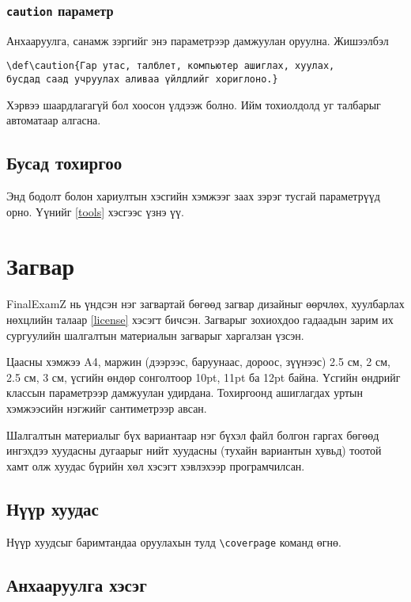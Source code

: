 \documentclass[10pt]{article}
\theoremstyle{definition}
\begin{document}
\subsubsection{\texttt{caution} параметр}

Анхааруулга, санамж зэргийг энэ параметрээр дамжуулан оруулна. Жишээлбэл 
\begin{verbatim}
\def\caution{Гар утас, талблет, компьютер ашиглах, хуулах, 
бусдад саад учруулах аливаа үйлдлийг хориглоно.}
\end{verbatim}
Хэрвээ шаардлагагүй бол хоосон үлдээж болно. Ийм тохиолдолд уг талбарыг автоматаар алгасна.

\subsection{Бусад тохиргоо}

Энд бодолт болон хариултын хэсгийн хэмжээг заах зэрэг тусгай параметрүүд орно. Үүнийг \ref{tools} хэсгээс үзнэ үү.

\section{Загвар}

FinalExamZ нь үндсэн нэг загвартай бөгөөд загвар дизайныг өөрчлөх, хуулбарлах нөхцлийн талаар \ref{license} хэсэгт бичсэн. Загварыг зохиохдоо гадаадын зарим их сургуулийн шалгалтын материалын загварыг харгалзан үзсэн.

\par Цаасны хэмжээ A4, маржин (дээрээс, баруунаас, дороос, зүүнээс) 2.5 см, 2 см, 2.5 см, 3 см, үсгийн өндөр сонголтоор 10pt, 11pt ба 12pt байна. Үсгийн өндрийг классын параметрээр дамжуулан удирдана. Тохиргоонд ашиглагдах уртын хэмжээсийн нэгжийг сантиметрээр авсан.

\par Шалгалтын материалыг бүх вариантаар нэг бүхэл файл болгон гаргах бөгөөд ингэхдээ хуудасны дугаарыг нийт хуудасны (тухайн вариантын хувьд) тоотой хамт олж хуудас бүрийн хөл хэсэгт хэвлэхээр програмчилсан.

\subsection{Нүүр хуудас}

Нүүр хуудсыг баримтандаа оруулахын тулд \verb|\coverpage| команд өгнө.

\subsection{Анхааруулга хэсэг}
\end{document}
